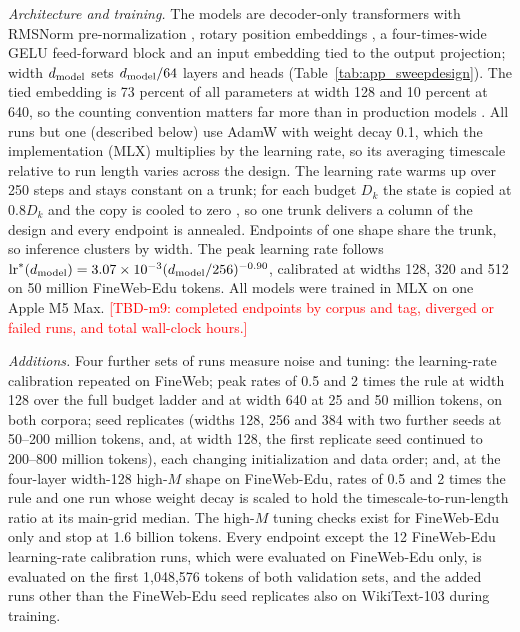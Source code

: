 \textit{Architecture and training.} The models are decoder-only transformers with RMSNorm pre-normalization
\citep{zhang2019root}, rotary position embeddings \citep{su2024roformer}, a four-times-wide GELU feed-forward block and an
input embedding tied to the output projection; width $d_{\rm model}$ sets $d_{\rm model}/64$ layers and heads
(Table~\ref{tab:app_sweepdesign}). The tied embedding is 73 percent of all parameters at width 128 and 10 percent at 640,
so the counting convention matters far more than in production models \citep{pearce2024reconciling,porian2024resolving}.
All runs but one (described below) use AdamW \citep{loshchilov2019decoupled} with weight decay 0.1, which the
implementation (MLX) multiplies by the learning rate, so its averaging timescale relative to run length varies across the design. The learning rate warms up over
250 steps and stays constant on a trunk; for each budget $D_k$ the state is copied at $0.8D_k$ and the copy is cooled to
zero \citep{hagele2024scaling}, so one trunk delivers a column of the design and every endpoint is annealed. Endpoints of
one shape share the trunk, so inference clusters by width. The peak learning rate follows
$\mathrm{lr}^{*}(d_{\rm model})=3.07\times10^{-3}(d_{\rm model}/256)^{-0.90}$, calibrated at widths 128, 320 and 512 on 50
million FineWeb-Edu tokens. All models were trained in MLX \citep{hannun2023mlx} on one Apple M5 Max.
\textcolor{red}{[TBD-m9: completed endpoints by corpus and tag, diverged or failed runs, and total wall-clock hours.]}



\textit{Additions.} Four further sets of runs measure noise and tuning: the learning-rate calibration repeated on FineWeb;
peak rates of 0.5 and 2 times the rule at width 128 over the full budget ladder and at width 640 at 25 and 50 million
tokens, on both corpora; seed replicates (widths 128, 256 and 384 with two further seeds at 50--200 million tokens, and,
at width 128, the first replicate seed continued to 200--800 million tokens), each changing initialization and data
order; and, at the four-layer width-128 high-$M$ shape on FineWeb-Edu, rates of 0.5 and 2 times the rule and one run
whose weight decay is scaled to hold the timescale-to-run-length ratio at its main-grid median. The high-$M$ tuning
checks exist for FineWeb-Edu only and stop at 1.6 billion tokens. Every endpoint except the 12 FineWeb-Edu
learning-rate calibration runs, which were evaluated on FineWeb-Edu only, is evaluated on the first 1,048,576 tokens of
both validation sets, and the added runs other than the FineWeb-Edu seed replicates also on WikiText-103
\citep{merity2016pointer} during training.

